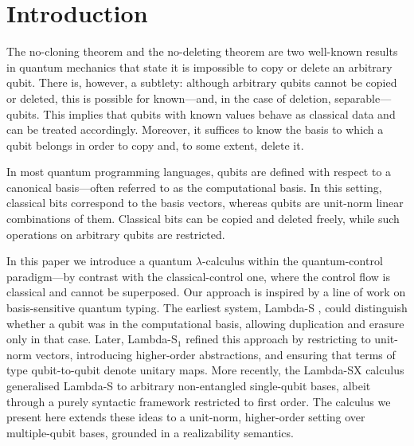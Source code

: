 \documentclass[runningheads,orivec,envcountsame,envcountsect]{llncs}
\begin{document}
\section{Introduction}
The no-cloning theorem \cite{WoottersZurek1982} and the no-deleting theorem
\cite{PatiBraunstein2000} are two well-known results in quantum mechanics that
state it is impossible to copy or delete an arbitrary qubit. 
There is, however, a subtlety: although arbitrary qubits
cannot be copied or deleted, this is possible for known---and, in the case of
deletion, separable---qubits. This implies that qubits with known values behave
as classical data and can be treated accordingly. Moreover, it suffices to know
the basis to which a qubit belongs in order to copy and, to some extent, delete it.

In most quantum programming languages, qubits are defined with respect to a
canonical basis—often referred to as the computational basis. In this setting,
classical bits correspond to the basis vectors, whereas qubits are unit-norm
linear combinations of them. Classical bits can be copied and deleted freely,
while such operations on arbitrary qubits are restricted.

In this paper we introduce a quantum $\lambda$-calculus within the
quantum-control paradigm—by contrast with the classical-control one, where the
control flow is classical and cannot be superposed. Our approach is inspired by
a line of work on basis-sensitive quantum typing. The earliest system,
Lambda-S \cite{DiazcaroDowekRinaldiBIO19}, could distinguish whether a qubit
was in the computational basis, allowing duplication and erasure only in that
case. Later, Lambda-S$_1$
\cite{DiazcaroGuillermoMiquelValironLICS19,DiazCaroMalherbe2022} refined this
approach by restricting to unit-norm vectors, introducing higher-order
abstractions, and ensuring that terms of type qubit-to-qubit denote unitary
maps. More recently, the Lambda-SX calculus \cite{DiazcaroMonzonAPLAS25}
generalised Lambda-S to arbitrary non-entangled single-qubit bases, albeit
through a purely syntactic framework restricted to first order. The calculus we
present here extends these ideas to a unit-norm, higher-order setting over
multiple-qubit bases, grounded in a realizability semantics.
\end{document}

